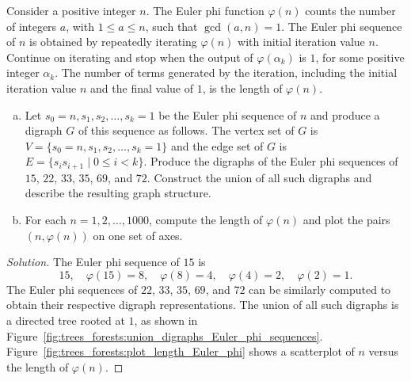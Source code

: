 \begin{example}
\label{eg:trees_forests:Euler_phi_function_tree}
Consider a positive integer $n$. The Euler
phi function
$\varphi(n)$ counts the number of integers $a$,
with $1 \leq a \leq n$, such that $\gcd(a,n) = 1$. The Euler phi
sequence of $n$ is obtained by repeatedly
iterating $\varphi(n)$ with initial iteration value $n$. Continue on
iterating and stop when the output of $\varphi(\alpha_k)$ is $1$, for
some positive integer $\alpha_k$. The number of terms generated by the
iteration, including the initial iteration value $n$ and the final
value of $1$, is the length of $\varphi(n)$.
\begin{enumerate}[(a)]
\item Let $s_0=n, s_1, s_2, \dots, s_k=1$ be the Euler phi
  sequence of $n$ and produce a digraph $G$
  of this sequence as follows. The vertex set of $G$ is
  $V = \{s_0=n, s_1, s_2, \dots, s_k=1\}$ and the edge set of $G$ is
  $E = \{s_i s_{i+1} \mid 0 \leq i < k\}$. Produce the digraphs of the
  Euler phi sequences of $15$, $22$, $33$,
  $35$, $69$, and $72$. Construct the union of
  all such digraphs and describe the resulting graph structure.

\item For each $n = 1, 2, \dots, 1000$, compute the length of
  $\varphi(n)$ and plot the pairs $(n, \varphi(n))$ on one set of axes.
\end{enumerate}
\end{example}

\begin{proof}[Solution]
The Euler phi sequence of $15$ is
\[
15,\quad
\varphi(15) = 8,\quad
\varphi(8) = 4,\quad
\varphi(4) = 2,\quad
\varphi(2) = 1.
\]
The Euler phi sequences of $22$, $33$, $35$,
$69$, and $72$ can be similarly computed to obtain their respective
digraph representations. The union of all such
digraphs is a directed tree rooted at $1$, as shown in
Figure~\ref{fig:trees_forests:union_digraphs_Euler_phi_sequences}.
Figure~\ref{fig:trees_forests:plot_length_Euler_phi} shows a
scatterplot of $n$ versus the length of
$\varphi(n)$.
\end{proof}

